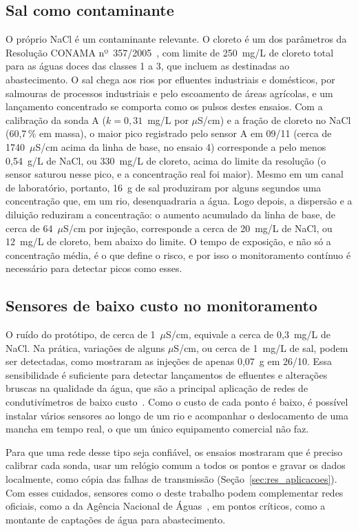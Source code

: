 \documentclass[12pt,a4paper]{article}
\providecommand{\uScm}{\ensuremath{\mu}S/cm}
\begin{document}
\subsection{Sal como contaminante}
O próprio NaCl é um contaminante relevante. O cloreto é um dos parâmetros da Resolução CONAMA nº~357/2005~\cite{conama2005}, com limite de 250~mg/L de cloreto total para as águas doces das classes 1 a 3, que incluem as destinadas ao abastecimento. O sal chega aos rios por efluentes industriais e domésticos, por salmouras de processos industriais e pelo escoamento de áreas agrícolas, e um lançamento concentrado se comporta como os pulsos destes ensaios. Com a calibração da sonda A ($k = 0{,}31$~mg/L por \uScm) e a fração de cloreto no NaCl (60,7\,\% em massa), o maior pico registrado pelo sensor A em 09/11 (cerca de 1740~\uScm{} acima da linha de base, no ensaio 4) corresponde a pelo menos 0,54~g/L de NaCl, ou 330~mg/L de cloreto, acima do limite da resolução (o sensor saturou nesse pico, e a concentração real foi maior). Mesmo em um canal de laboratório, portanto, 16~g de sal produziram por alguns segundos uma concentração que, em um rio, desenquadraria a água. Logo depois, a dispersão e a diluição reduziram a concentração: o aumento acumulado da linha de base, de cerca de 64~\uScm{} por injeção, corresponde a cerca de 20~mg/L de NaCl, ou 12~mg/L de cloreto, bem abaixo do limite. O tempo de exposição, e não só a concentração média, é o que define o risco, e por isso o monitoramento contínuo é necessário para detectar picos como esses.

\subsection{Sensores de baixo custo no monitoramento}
O ruído do protótipo, de cerca de 1~\uScm, equivale a cerca de 0,3~mg/L de NaCl. Na prática, variações de alguns \uScm, ou cerca de 1~mg/L de sal, podem ser detectadas, como mostraram as injeções de apenas 0,07~g em 26/10. Essa sensibilidade é suficiente para detectar lançamentos de efluentes e alterações bruscas na qualidade da água, que são a principal aplicação de redes de condutivímetros de baixo custo~\cite{camargo2023,visco2023}. Como o custo de cada ponto é baixo, é possível instalar vários sensores ao longo de um rio e acompanhar o deslocamento de uma mancha em tempo real, o que um único equipamento comercial não faz.

Para que uma rede desse tipo seja confiável, os ensaios mostraram que é preciso calibrar cada sonda, usar um relógio comum a todos os pontos e gravar os dados localmente, como cópia das falhas de transmissão (Seção~\ref{sec:res_aplicacoes}). Com esses cuidados, sensores como o deste trabalho podem complementar redes oficiais, como a da Agência Nacional de Águas~\cite{camargo2023}, em pontos críticos, como a montante de captações de água para abastecimento.
\end{document}
